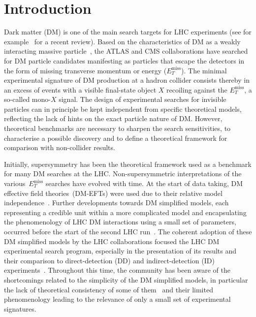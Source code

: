\documentclass[a4paper, 11pt,notoc]{article}
\newcommand{\MET}{\ensuremath{E_T^\mathrm{miss}}\xspace}
\begin{document}
\maketitle


\section{Introduction}
\label{sec:introduction}

Dark matter (DM) is one of the main search targets for LHC experiments (see for example~\cite{Kahlhoefer:2017dnp} for a recent review). Based on the characteristics of DM as a weakly interacting massive particle~\cite{Bertone:2004pz}, the ATLAS and CMS collaborations have searched for DM particle candidates manifesting as particles that escape the detectors in the form of missing transverse momentum or energy ($\MET$). The minimal experimental signature of DM production at a hadron collider consists thereby in an excess of events with a visible final-state object $X$ recoiling against the $\MET$, a so-called mono-$X$ signal.  The design of experimental searches for invisible particles can in principle be kept independent from specific theoretical models, reflecting the lack of hints on the exact particle nature of DM. However, theoretical benchmarks are necessary to sharpen the search sensitivities, to characterise a possible discovery and to define a theoretical framework for comparison with non-collider results. 

Initially, supersymmetry has been the theoretical framework used as a benchmark for many DM searches at the LHC.  Non-supersymmetric interpretations of the various~$\MET$ searches have  evolved with time. At the start of data taking, DM effective field theories~(DM-EFTs)  were used due to their relative model independence~\cite{Cao:2009uw,Beltran:2010ww,Goodman:2010yf,Bai:2010hh,Goodman:2010ku,Fox:2011pm}.  Further developments towards DM simplified models, each representing a credible unit within a more complicated model and  encapsulating the phenomenology of LHC DM interactions using a small set of parameters, occurred before  the start of the second LHC run~\cite{Abdallah:2015ter,Abercrombie:2015wmb}.  The coherent adoption of these DM simplified models by the LHC collaborations focused the LHC DM experimental search program, especially in the presentation of its results and their comparison to direct-detection (DD) and indirect-detection (ID) experiments~\cite{Boveia:2016mrp,Albert:2017onk}.  Throughout this time, the community has been aware of the shortcomings related to the simplicity of the DM simplified models, in particular the lack of theoretical consistency of some of them~\cite{Chala:2015ama,Bell:2015sza,Kahlhoefer:2015bea,Bell:2015rdw,Haisch:2016usn,Englert:2016joy,Ko:2016zxg} and their limited phenomenology leading to the relevance of only a small set of experimental signatures.  
\end{document}

